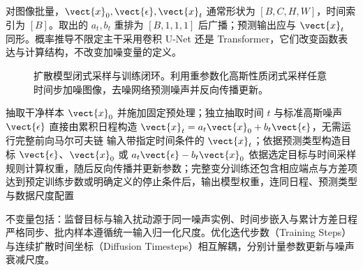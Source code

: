 \documentclass[../textbook.tex]{subfiles}
\begin{document}
对图像批量，$\vect{x}_0,\vect{\epsilon},\vect{x}_t$ 通常形状为 $[B,C,H,W]$，时间索引为 $[B]$。取出的 $a_t,b_t$ 重排为 $[B,1,1,1]$ 后广播；预测输出应与 $\vect{x}_t$ 同形。概率推导不限定主干采用卷积 U-Net 还是 Transformer，它们改变函数表达与计算结构，不改变加噪变量的定义。

\begin{figure}[htbp]
\centering
{}
\caption[扩散模型闭式采样与训练闭环]{扩散模型闭式采样与训练闭环。利用重参数化高斯性质闭式采样任意时间步加噪图像，去噪网络预测噪声并反向传播更新。}\label{fig:diffusion-training-loop}
\end{figure}

\begin{algorithm}[噪声预测训练]
\begin{myalgorithmic}[1]
\State 抽取干净样本 $\vect{x}_0$ 并施加固定预处理；独立抽取时间 $t$ 与标准高斯噪声 $\vect{\epsilon}$
\State 直接由累积日程构造 $\vect{x}_t=a_t\vect{x}_0+b_t\vect{\epsilon}$，无需运行完整前向马尔可夫链
\State 输入带指定时间条件的 $\vect{x}_t$；依据预测类型构造目标 $\vect{\epsilon}$、$\vect{x}_0$ 或 $a_t\vect{\epsilon}-b_t\vect{x}_0$
\State 依据选定目标与时间采样规则计算权重，随后反向传播并更新参数；完整变分训练还包含相应端点与方差项
\State 达到预定训练步数或明确定义的停止条件后，输出模型权重，连同日程、预测类型与数据尺度配置
\end{myalgorithmic}
不变量包括：监督目标与输入扰动源于同一噪声实例、时间步嵌入与累计方差日程严格同步、批内样本遵循统一输入归一化尺度。优化迭代步数（Training Steps）与连续扩散时间坐标（Diffusion Timesteps）相互解耦，分别计量参数更新与噪声衰减尺度。
\end{algorithm}
\end{document}
